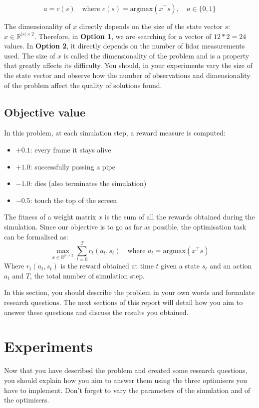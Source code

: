 \documentclass[runningheads]{llncs}
\begin{document}
\[
a=c(s) \quad \text{where } c(s)=\text{argmax}(x ^\top s), \quad a \in \{0, 1\}
\]

The dimensionality of $x$ directly depends on the size of the state vector $s$: $x\in\mathbb{R}^{|s|\times2}$. Therefore, in \textbf{Option 1}, we are searching for a vector of $12*2=24$ values. In \textbf{Option 2}, it directly depends on the number of lidar measurements used. The size of $x$ is called the dimensionality of the problem and is a property that greatly affects its difficulty. You should, in your experiments vary the size of the state vector and observe how the number of observations and dimensionality of the problem affect the quality of solutions found.

\subsection{Objective value}
In this problem, at each simulation step, a reward measure is computed:
\begin{itemize}
    \item $+0.1$: every frame it stays alive
    \item $+1.0$: successfully passing a pipe
    \item $-1.0$: dies (also terminates the simulation)
    \item $-0.5$: touch the top of the screen
\end{itemize}

The fitness of a weight matrix $x$ is the sum of all the rewards obtained during the simulation. Since our objective is to go as far as possible, the optimisation task can be formalised as:
\[
\max_{x\in\mathbb{R}^{|s|\times2}}\sum_{t=0}^Tr_t(a_t,s_t)\quad \text{where }a_t=\text{argmax}(x ^\top s)
\]
Where $r_t (a_t, s_t)$ is the reward obtained at time $t$ given a state $s_t$ and an action $a_t$ and $T$, the total number of simulation step.

In this section, you should describe the problem in your own words and formulate research questions. The next sections of this report will detail how you aim to answer these questions and discuss the results you obtained.

\section{Experiments}
Now that you have described the problem and created some research questions, you should explain how you aim to answer them using the three optimisers you have to implement. Don't forget to vary the parameters of the simulation and of the optimisers.
\end{document}
